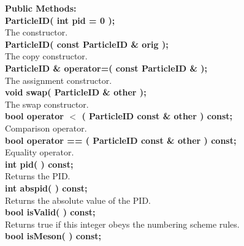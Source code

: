 \begin{tabbing}
{\bf Public Methods:} \\
\hspace{0.5in}  {\bf ParticleID( int pid = 0 ); } \\
\hspace{1.0in}  The constructor.\\
\hspace{0.5in}  {\bf ParticleID( const ParticleID \& orig ); } \\
\hspace{1.0in}  The copy constructor. \\
\hspace{0.5in}  {\bf ParticleID \& operator=( const ParticleID \& ); } \\
\hspace{1.0in}  The assignment constructor. \\
\hspace{0.5in}  {\bf void swap( ParticleID \& other ); } \\
\hspace{1.0in}  The swap constructor. \\
\hspace{0.5in}  {\bf bool  operator $<$  ( ParticleID const \& other ) const;} \\
\hspace{1.0in}  Comparison operator. \\
\hspace{0.5in}  {\bf bool  operator == ( ParticleID const \& other ) const;} \\
\hspace{1.0in}  Equality operator. \\
\hspace{0.5in}  {\bf int    pid( )        const; } \\
\hspace{1.0in}  Returns the PID. \\
\hspace{0.5in}  {\bf int abspid( )        const; } \\
\hspace{1.0in}  Returns the absolute value of the PID. \\
\hspace{0.5in}  {\bf bool isValid( )   const; }\\
\hspace{1.0in}  Returns true if this integer obeys the numbering scheme rules. \\
\hspace{0.5in}  {\bf bool isMeson( )   const; }\\

\end{tabbing}

